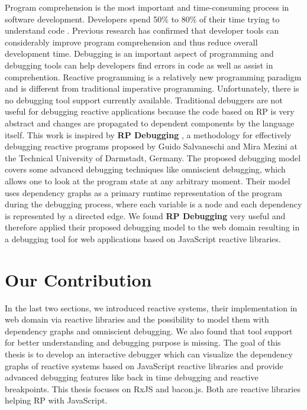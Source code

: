 Program comprehension is the most important and time-consuming process in software development. Developers spend 50\% to 80\% of their time trying to understand code \cite{6032450,6772122}. Previous research has confirmed that developer tools can considerably improve program comprehension \cite{1421034} and thus reduce overall development time. Debugging is an important aspect of programming and debugging tools can help developers find errors in code as well as assist in comprehention. 
Reactive programming is a relatively new programming paradigm and is different from traditional imperative programming. 
Unfortunately, there is no debugging tool support currently available.
Traditional debuggers are not useful for debugging reactive applications because the code based on RP is very abstract and changes are propagated to dependent components by the language itself.
This work is inspired by \textbf{RP Debugging} \cite{Salvaneschi:2016:DRP:2884781.2884815}, a methodology for effectively debugging reactive programs proposed by Guido Salvaneschi and Mira Mezini at the Technical University of Darmstadt, Germany. The proposed debugging model covers some advanced debugging techniques like omniscient debugging, which allows one to look at the program
state at any arbitrary moment. Their model uses dependency graphs as a primary runtime representation of the program during the debugging process, where each variable is a node and each dependency is represented by a directed edge. We found \textbf{RP Debugging} very useful and therefore applied their proposed debugging model to the web domain resulting in a debugging tool for web applications based on JavaScript reactive libraries. 

\section{Our Contribution}

In the last two sections, we introduced reactive systems, their implementation in web domain via reactive libraries and the possibility to model them with dependency graphs and omniscient debugging. We also found that tool support for better understanding and debugging purpose is missing.
The goal of this thesis is to develop an interactive debugger which can visualize the dependency graphs of reactive systems based on JavaScript reactive libraries and provide advanced debugging features like back in time debugging and reactive breakpoints. This thesis focuses on RxJS and bacon.js.  Both are reactive libraries helping RP with JavaScript.


